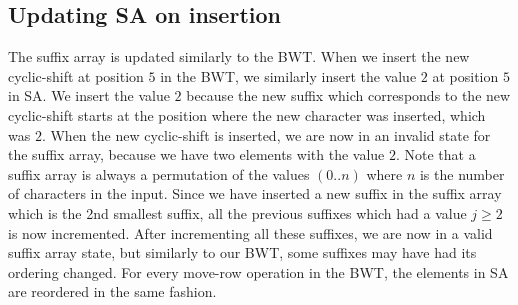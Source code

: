 \subsection*{Updating SA on insertion}

The suffix array is updated similarly to the BWT. When we insert the new cyclic-shift at
position $5$ in the BWT, we similarly insert the value $2$ at position $5$ in SA. We
insert the value $2$ because the new suffix which corresponds to the new cyclic-shift
starts at the position where the new character was inserted, which was $2$. When the new
cyclic-shift is inserted, we are now in an invalid state for the suffix array, because we
have two elements with the value $2$. Note that a suffix array is always a permutation of
the values $(0..n)$ where $n$ is the number of characters in the input. Since we have
inserted a new suffix in the suffix array which is the 2nd smallest suffix, all the
previous suffixes which had a value $j \geq 2$ is now incremented. After incrementing all
these suffixes, we are now in a valid suffix array state, but similarly to our BWT, some
suffixes may have had its ordering changed. For every move-row operation in the BWT, the
elements in SA are reordered in the same fashion.

